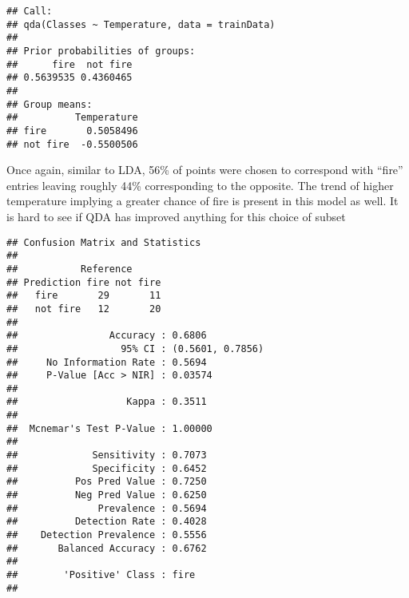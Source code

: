 \documentclass[
]{article}
\newenvironment{Shaded}{\begin{snugshade}}{\end{snugshade}}
\newcommand{\AttributeTok}[1]{\textcolor[rgb]{0.13,0.29,0.53}{#1}}
\newcommand{\CommentTok}[1]{\textcolor[rgb]{0.56,0.35,0.01}{\textit{#1}}}
\newcommand{\FunctionTok}[1]{\textcolor[rgb]{0.13,0.29,0.53}{\textbf{#1}}}
\newcommand{\NormalTok}[1]{#1}
\newcommand{\OtherTok}[1]{\textcolor[rgb]{0.56,0.35,0.01}{#1}}
\newcommand{\SpecialCharTok}[1]{\textcolor[rgb]{0.81,0.36,0.00}{\textbf{#1}}}
\begin{document}
\begin{verbatim}
## Call:
## qda(Classes ~ Temperature, data = trainData)
## 
## Prior probabilities of groups:
##      fire  not fire 
## 0.5639535 0.4360465 
## 
## Group means:
##          Temperature
## fire       0.5058496
## not fire  -0.5500506
\end{verbatim}

Once again, similar to LDA, 56\% of points were chosen to correspond
with ``fire'' entries leaving roughly 44\% corresponding to the
opposite. The trend of higher temperature implying a greater chance of
fire is present in this model as well. It is hard to see if QDA has
improved anything for this choice of subset

\begin{Shaded}
\end{Shaded}

\begin{verbatim}
## Confusion Matrix and Statistics
## 
##           Reference
## Prediction fire not fire
##   fire       29       11
##   not fire   12       20
##                                           
##                Accuracy : 0.6806          
##                  95% CI : (0.5601, 0.7856)
##     No Information Rate : 0.5694          
##     P-Value [Acc > NIR] : 0.03574         
##                                           
##                   Kappa : 0.3511          
##                                           
##  Mcnemar's Test P-Value : 1.00000         
##                                           
##             Sensitivity : 0.7073          
##             Specificity : 0.6452          
##          Pos Pred Value : 0.7250          
##          Neg Pred Value : 0.6250          
##              Prevalence : 0.5694          
##          Detection Rate : 0.4028          
##    Detection Prevalence : 0.5556          
##       Balanced Accuracy : 0.6762          
##                                           
##        'Positive' Class : fire            
## 
\end{verbatim}
\end{document}
